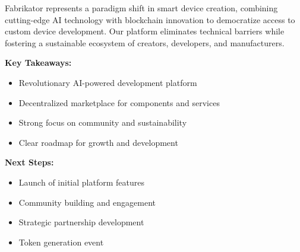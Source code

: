 \vspace{0.5cm}
\noindent Fabrikator represents a paradigm shift in smart device creation, combining cutting-edge AI technology with blockchain innovation to democratize access to custom device development. Our platform eliminates technical barriers while fostering a sustainable ecosystem of creators, developers, and manufacturers.

\vspace{0.5cm}
\noindent\textbf{Key Takeaways:}
\begin{itemize}[leftmargin=*]
    \item Revolutionary AI-powered development platform
    \item Decentralized marketplace for components and services
    \item Strong focus on community and sustainability
    \item Clear roadmap for growth and development
\end{itemize}

\vspace{0.5cm}
\noindent\textbf{Next Steps:}
\begin{itemize}[leftmargin=*]
    \item Launch of initial platform features
    \item Community building and engagement
    \item Strategic partnership development
    \item Token generation event
\end{itemize}